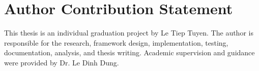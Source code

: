 \chapter*{Author Contribution Statement}

This thesis is an individual graduation project by Le Tiep Tuyen. The author is responsible for the research, framework design, implementation, testing, documentation, analysis, and thesis writing. Academic supervision and guidance were provided by Dr. Le Dinh Dung.
